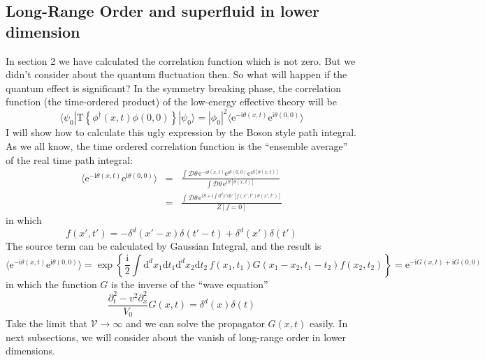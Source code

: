 \documentclass{article}
\newcommand{\im}{\mathrm{i}}
\newcommand{\ep}{\mathrm{e}}
\newcommand{\ud}{\mathrm{d}}
\begin{document}
\subsection{Long-Range Order and superfluid in lower dimension}
In section 2 we have calculated the correlation function which is not zero. But we didn't consider about the quantum fluctuation then. So what will happen if the quantum effect is significant? In the symmetry breaking phase, the correlation function (the time-ordered product) of the low-energy effective theory will be
$$
\langle \psi_0 |\mathrm{T}\left\{\phi^\dagger(x,t)\phi(0,0)\right\}| \psi_0\rangle =|\phi_0|^2\langle \ep^{-\im\theta(x,t)}\ep^{\im\theta(0,0)}\rangle
$$
I will show how to calculate this ugly expression by the Boson style path integral. As we all know, the time ordered correlation function is the ``ensemble average'' of the real time path integral:
\begin{eqnarray}
\langle \ep^{-\im\theta(x,t)}\ep^{\im\theta(0,0)}\rangle &=& \frac{\int\mathcal{D}\theta\, \ep^{-\im\theta(x,t)}\ep^{\im\theta(0,0)}\ep^{\im S[\theta(x,t)]}}{\int \mathcal{D}\theta \,\ep^{\im S[\theta(x,t)]}}\nonumber\\
&=&\frac{\int \mathcal{D}\theta\,\ep^{\im S + \im\int \ud^dx' \ud t'[f(x',t')\theta(x',t')]}}{Z[f=0]}
\end{eqnarray}
in which
$$
f(x',t') = -\delta^d(x'-x)\delta(t'-t) + \delta^d(x')\delta(t')
$$
The source term can be calculated by Gaussian Integral, and the result is
\begin{equation}
\langle \ep^{-\im\theta(x,t)}\ep^{\im\theta(0,0)}\rangle =\exp\left\{\frac{\im}{2}\int\ud^dx_1\ud t_1\ud^dx_2\ud t_2 \,f(x_1,t_1)G(x_1-x_2,t_1-t_2)f(x_2,t_2) \right\} = \ep^{-\im G(x,t)+\im G(0,0)}
\end{equation}
in which the function $G$ is the inverse of the ``wave equation''
\begin{equation}
\frac{\partial_t^2 -v^2\partial_x^2}{V_0}G(x,t) = \delta^{d}(x)\delta(t)
\end{equation}
Take the limit that $\mathcal{V}\rightarrow \infty$ and we can solve the propagator $G(x,t)$ easily. In next subsections, we will consider about the vanish of long-range order in lower dimensions.
\end{document}
